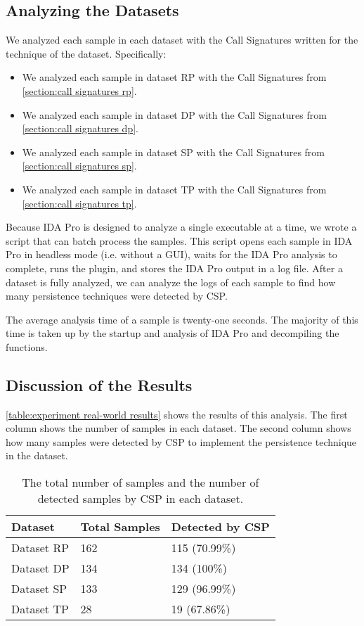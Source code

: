 \subsection{Analyzing the Datasets}
We analyzed each sample in each dataset with the Call Signatures written for the technique of the dataset. Specifically:
\begin{itemize}
    \item We analyzed each sample in dataset RP with the Call Signatures from \autoref{section:call signatures rp}.
    \item We analyzed each sample in dataset DP with the Call Signatures from \autoref{section:call signatures dp}.
    \item We analyzed each sample in dataset SP with the Call Signatures from \autoref{section:call signatures sp}.
    \item We analyzed each sample in dataset TP with the Call Signatures from \autoref{section:call signatures tp}.
\end{itemize}

Because IDA Pro is designed to analyze a single executable at a time, we wrote a script that can batch process the samples. This script opens each sample in IDA Pro in headless mode (i.e. without a GUI), waits for the IDA Pro analysis to complete, runs the plugin, and stores the IDA Pro output in a log file. After a dataset is fully analyzed, we can analyze the logs of each sample to find how many persistence techniques were detected by CSP.

The average analysis time of a sample is twenty-one seconds. The majority of this time is taken up by the startup and analysis of IDA Pro and decompiling the functions.

\subsection{Discussion of the Results}
\autoref{table:experiment real-world results} shows the results of this analysis. The first column shows the number of samples in each dataset. The second column shows how many samples were detected by CSP to implement the persistence technique in the dataset.

\begin{table}[ht]
    \centering
    \begin{tabular}{l|ll}
        \hline
        Dataset     & Total Samples & Detected by CSP   \\ \hline
        Dataset RP  & 162           & 115 (70.99\%)     \\ \hline
        Dataset DP  & 134           & 134 (100\%)       \\ \hline
        Dataset SP  & 133           & 129 (96.99\%)     \\ \hline
        Dataset TP  &  28           &  19 (67.86\%)     \\ \hline
    \end{tabular}
    \caption{The total number of samples and the number of detected samples by CSP in each dataset.}
    \label{table:experiment real-world results}
\end{table}

